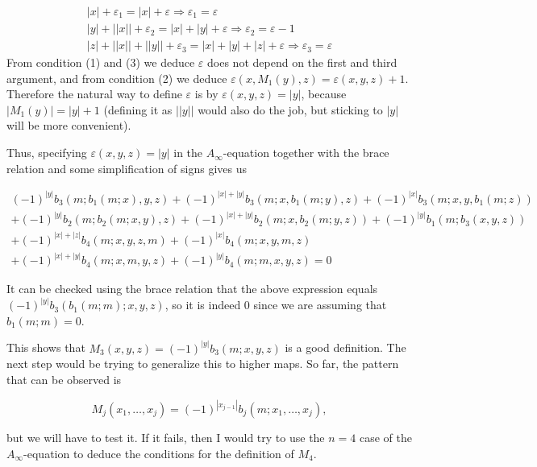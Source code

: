 \documentclass[twoside]{article}
\begin{document}
\begin{gather}
|x|+\varepsilon_1=|x|+\varepsilon\Rightarrow\varepsilon_1=\varepsilon\\
|y|+||x||+\varepsilon_2=|x|+|y|+\varepsilon\Rightarrow \varepsilon_2=\varepsilon-1\\
|z|+||x||+||y||+\varepsilon_3=|x|+|y|+|z|+\varepsilon\Rightarrow\varepsilon_3=\varepsilon
\end{gather}
From condition (1) and (3) we deduce $\varepsilon$ does not depend on the first and third argument, and from condition (2) we deduce $\varepsilon(x,M_1(y),z)=\varepsilon(x,y,z)+1$. Therefore the natural way to define $\varepsilon$ is by $\varepsilon(x,y,z)=|y|$, because $|M_1(y)|=|y|+1$ (defining it as $||y||$ would also do the job, but sticking to $|y|$ will be more convenient).

Thus, specifying $\varepsilon(x,y,z)=|y|$ in the $A_\infty$-equation together with the brace relation and some simplification of signs gives us

\begin{align*}
(-1)^{|y|}b_3(m;b_1(m;x),y,z)+(-1)^{|x|+|y|}b_3(m;x,b_1(m;y),z)+(-1)^{|x|}b_3(m;x,y,b_1(m;z))\\
+(-1)^{|y|}b_2(m;b_2(m;x,y),z)+(-1)^{|x|+|y|}b_2(m;x,b_2(m;y,z))+(-1)^{|y|}b_1(m;b_3(x,y,z))\\
+(-1)^{|x|+|z|}b_4(m;x,y,z,m)+(-1)^{|x|}b_4(m;x,y,m,z)\\
+(-1)^{|x|+|y|}b_4(m;x,m,y,z)+(-1)^{|y|}b_4(m;m,x,y,z)=0
\end{align*}

It can be checked using the brace relation that the above expression equals $(-1)^{|y|}b_3(b_1(m;m);x,y,z)$, so it is indeed 0 since we are assuming that $b_1(m;m)=0$. 

This shows that $M_3(x,y,z)=(-1)^{|y|}b_3(m;x,y,z)$ is a good definition. The next step would be trying to generalize this to higher maps. So far, the pattern that can be observed is

$$M_j(x_1,\dots,x_j)=(-1)^{|x_{j-1}|}b_j(m;x_1,\dots, x_j),$$

but we will have to test it. If it fails, then I would try to use the $n=4$ case of the $A_\infty$-equation to deduce the conditions for the definition of $M_4$.
\end{document}
